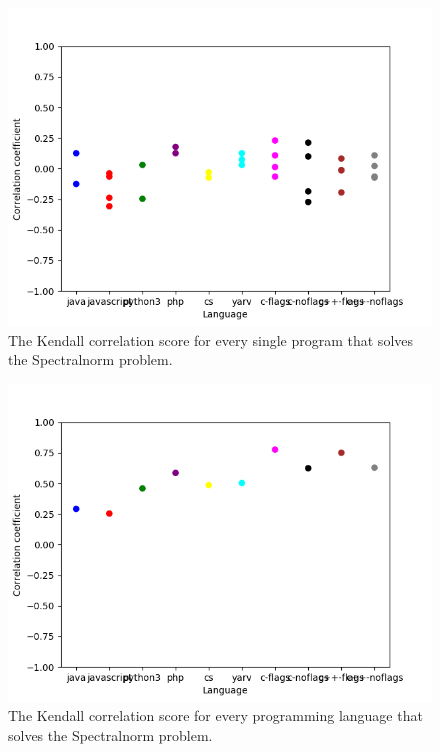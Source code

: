 \begin{appendices}
\begin{figure}[h]
    \centering
    \includegraphics[width=.6\textwidth]{graphs/kendall_Spectralnorm.png}
    \caption{The Kendall correlation score for every single program that solves the Spectralnorm problem.}
    \label{fig:corr-spectralnorm}
\end{figure}

\begin{figure}[h]
    \centering
    \includegraphics[width=.6\textwidth]{graphs/kendall-lang_Spectralnorm.png}
    \caption{The Kendall correlation score for every programming language that solves the Spectralnorm problem.}
    \label{fig:corr-lang-spectralnorm}
\end{figure}

\end{appendices}